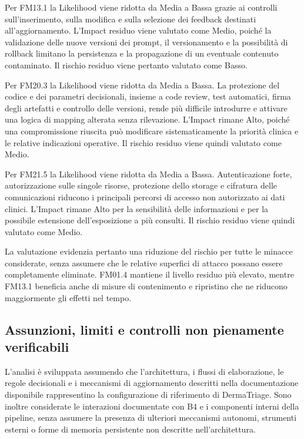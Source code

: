 Per FM13.1 la Likelihood viene ridotta da Media a Bassa grazie ai controlli sull'inserimento, sulla modifica e sulla selezione dei feedback destinati all'aggiornamento. L'Impact residuo viene valutato come Medio, poiché la validazione delle nuove versioni dei prompt, il versionamento e la possibilità di rollback limitano la persistenza e la propagazione di un eventuale contenuto contaminato. Il rischio residuo viene pertanto valutato come Basso.

Per FM20.3 la Likelihood viene ridotta da Media a Bassa. La protezione del codice e dei parametri decisionali, insieme a code review, test automatici, firma degli artefatti e controllo delle versioni, rende più difficile introdurre e attivare una logica di mapping alterata senza rilevazione. L'Impact rimane Alto, poiché una compromissione riuscita può modificare sistematicamente la priorità clinica e le relative indicazioni operative. Il rischio residuo viene quindi valutato come Medio.

Per FM21.5 la Likelihood viene ridotta da Media a Bassa. Autenticazione forte, autorizzazione sulle singole risorse, protezione dello storage e cifratura delle comunicazioni riducono i principali percorsi di accesso non autorizzato ai dati clinici. L'Impact rimane Alto per la sensibilità delle informazioni e per la possibile estensione dell'esposizione a più consulti. Il rischio residuo viene quindi valutato come Medio.

La valutazione evidenzia pertanto una riduzione del rischio per tutte le minacce considerate, senza assumere che le relative superfici di attacco possano essere completamente eliminate. FM01.4 mantiene il livello residuo più elevato, mentre FM13.1 beneficia anche di misure di contenimento e ripristino che ne riducono maggiormente gli effetti nel tempo.

\subsection{Assunzioni, limiti e controlli non pienamente verificabili}
L'analisi è sviluppata assumendo che l'architettura, i flussi di elaborazione, le regole decisionali e i meccanismi di aggiornamento descritti nella documentazione disponibile rappresentino la configurazione di riferimento di DermaTriage. Sono inoltre considerate le interazioni documentate con B4 e i componenti interni della pipeline, senza assumere la presenza di ulteriori meccanismi autonomi, strumenti esterni o forme di memoria persistente non descritte nell'architettura.

